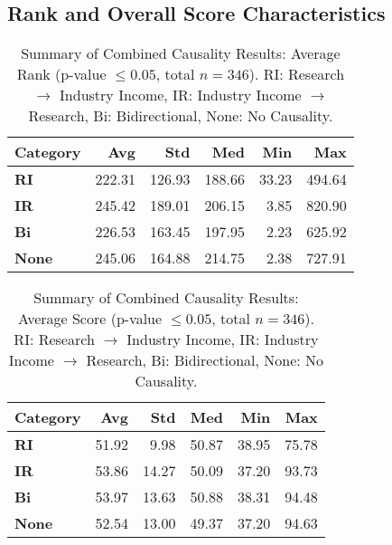 \documentclass[a4paper, conference]{IEEEtran}
\begin{document}
\subsection{Rank and Overall Score Characteristics}

\begin{table}
	\centering
	\caption{Summary of Combined Causality Results: Average Rank (p-value $\leq 0.05$, total $n=346$). RI: Research $\rightarrow$ Industry Income, IR: Industry Income $\rightarrow$ Research, Bi: Bidirectional, None: No Causality.}
	\label{tab:category_average}
	\begin{scriptsize}
		\begin{tabular}{|l|r|r|r|r|r|}
			\hline
			\textbf{Category} & \textbf{Avg} & \textbf{Std} & \textbf{Med} & \textbf{Min} & \textbf{Max} \\ \hline
			\textbf{RI}           & 222.31  & 126.93  & 188.66  & 33.23   & 494.64  \\ \hline
			\textbf{IR}           & 245.42  & 189.01  & 206.15  & 3.85    & 820.90  \\ \hline
			\textbf{Bi}           & 226.53  & 163.45  & 197.95  & 2.23    & 625.92  \\ \hline
			\textbf{None}         & 245.06  & 164.88  & 214.75  & 2.38    & 727.91  \\ \hline
		\end{tabular}
	\end{scriptsize}
\end{table}

\begin{table}
	\centering
	\caption{Summary of Combined Causality Results: Average Score (p-value $\leq 0.05$, total $n=346$). RI: Research $\rightarrow$ Industry Income, IR: Industry Income $\rightarrow$ Research, Bi: Bidirectional, None: No Causality.}
	\label{tab:category_score}
	\begin{scriptsize}
		\begin{tabular}{|l|r|r|r|r|r|}
			\hline
			\textbf{Category} & \textbf{Avg} & \textbf{Std} & \textbf{Med} & \textbf{Min} & \textbf{Max} \\ \hline
			\textbf{RI}           & 51.92  & 9.98    & 50.87  & 38.95  & 75.78  \\ \hline
			\textbf{IR}           & 53.86  & 14.27   & 50.09  & 37.20  & 93.73  \\ \hline
			\textbf{Bi}           & 53.97  & 13.63   & 50.88  & 38.31  & 94.48  \\ \hline
			\textbf{None}         & 52.54  & 13.00   & 49.37  & 37.20  & 94.63  \\ \hline
		\end{tabular}
	\end{scriptsize}
\end{table}
\end{document}
